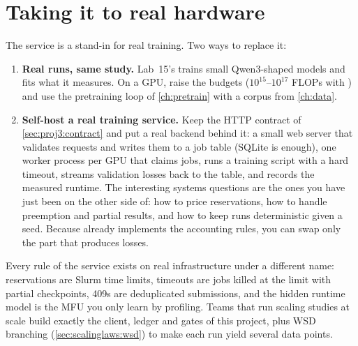 \section{Taking it to real hardware}\label{sec:proj3:real}

The service is a stand-in for real training. Two ways to replace it:
\begin{enumerate}
\item \textbf{Real runs, same study.} Lab~15's  trains small Qwen3-shaped
      models and fits what it measures. On a GPU, raise the budgets
      ($10^{15}$--$10^{17}$ FLOPs with ) and use the pretraining loop of
      \cref{ch:pretrain} with a corpus from \cref{ch:data}.
\item \textbf{Self-host a real training service.} Keep the HTTP contract of
      \cref{sec:proj3:contract} and put a real backend behind it: a small web server that
      validates requests and writes them to a job table (SQLite is enough), one worker process per
      GPU that claims jobs, runs a training script with a hard timeout, streams validation losses
      back to the table, and records the measured runtime. The interesting systems questions are
      the ones you have just been on the other side of: how to price reservations, how to
      handle preemption and partial results, and how to keep runs deterministic given a seed.
      Because  already implements the accounting rules, you can swap
      only the part that produces losses.
\end{enumerate}

\begin{systemslens}
Every rule of the service exists on real infrastructure under a different name: reservations
are Slurm time limits, timeouts are jobs killed at the limit with partial checkpoints, 409s are
deduplicated submissions, and the hidden runtime model is the MFU you only learn by profiling.
Teams that run scaling studies at scale build exactly the client, ledger and gates of this
project, plus WSD branching (\cref{sec:scalinglaws:wsd}) to make each run yield several
data points.
\end{systemslens}
